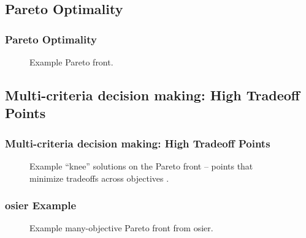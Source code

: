 \subsection{Pareto Optimality}
\begin{frame}
  \frametitle{Pareto Optimality}
        
  \begin{figure}[htbp!]
    \begin{center}
      \resizebox{0.65\columnwidth}{!}{}
    \end{center}
          \caption{Example Pareto front.}
    \label{fig:pareto-example}
  \end{figure}
\end{frame}

\subsection{Multi-criteria decision making: High Tradeoff Points}
\begin{frame}
  \frametitle{Multi-criteria decision making: High Tradeoff Points}
        
  \begin{figure}[htbp!]
    \begin{center}
      \resizebox{0.65\columnwidth}{!}{}
    \end{center}
          \caption{Example ``knee'' solutions on the Pareto front -- points that minimize tradeoffs across objectives \cite{rachmawati_multiobjective_2009}.}
    \label{fig:knee-example}
  \end{figure}
\end{frame}


\begin{frame}
    \frametitle{\Gls{osier} Example}
      \begin{figure}[htbp!]
    \begin{center}
      \resizebox{\columnwidth}{!}{}
    \end{center}
          \caption{Example many-objective Pareto front from \Gls{osier}.}
    \label{fig:4-obj-pareto-example}
  \end{figure}
\end{frame}